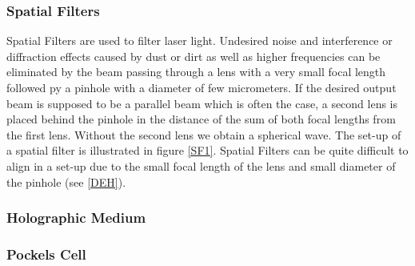 

\subsubsection{Spatial Filters \label{SF}}

Spatial Filters are used to filter laser light. Undesired noise and interference or diffraction effects caused by dust or dirt as well as higher frequencies can be eliminated by the beam passing through a lens with a very small focal length followed py a pinhole with a diameter of few micrometers. If the desired output beam is supposed to be a parallel beam which is often the case, a second lens is placed behind the pinhole in the distance of the sum of both focal lengths from the first lens. Without the second lens we obtain a spherical wave. The set-up of a spatial filter is illustrated in figure \ref{SF1}. Spatial Filters can be quite difficult to align in a set-up due to the small focal length of the lens and small diameter of the pinhole (see \ref{DEH}).


\subsubsection{Holographic Medium}

\subsubsection{Pockels Cell}

